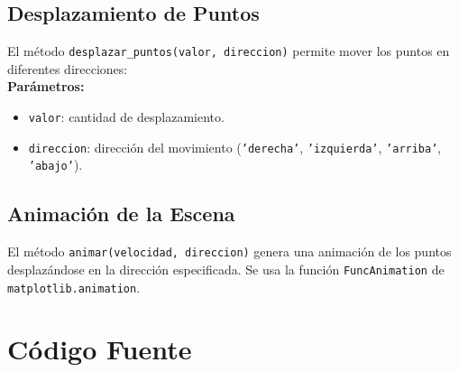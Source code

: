 \documentclass[a4paper, 10pt]{article}
\begin{document}
\subsection{Desplazamiento de Puntos}
El método \texttt{desplazar\_puntos(valor, direccion)} permite mover los puntos en diferentes direcciones:\\
\textbf{Parámetros:}
\begin{itemize}
    \item \texttt{valor}: cantidad de desplazamiento.
    \item \texttt{direccion}: dirección del movimiento (\texttt{'derecha'}, \texttt{'izquierda'}, \texttt{'arriba'}, \texttt{'abajo'}).
\end{itemize}

\subsection{Animación de la Escena}
El método \texttt{animar(velocidad, direccion)} genera una animación de los puntos desplazándose en la dirección especificada. Se usa la función \texttt{FuncAnimation} de \texttt{matplotlib.animation}.

\section{Código Fuente}
\end{document}
